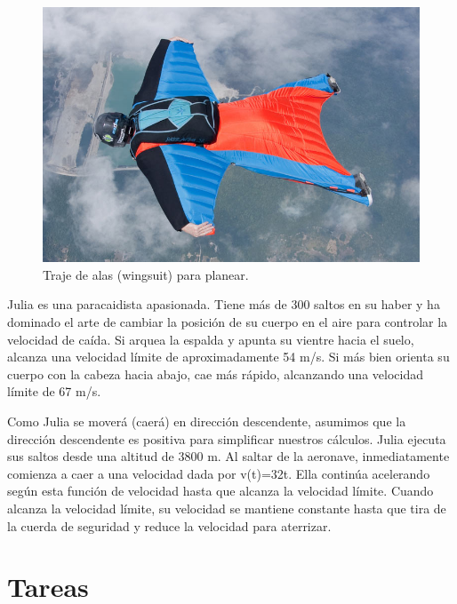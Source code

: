 \documentclass[
  a4paper,
]{scrreport}
\begin{document}
\begin{figure}

{\centering \includegraphics{img/caida-libre/wingsuit.jpg}

}

\caption{Traje de alas (wingsuit) para planear.}

\end{figure}

Julia es una paracaidista apasionada. Tiene más de 300 saltos en su
haber y ha dominado el arte de cambiar la posición de su cuerpo en el
aire para controlar la velocidad de caída. Si arquea la espalda y apunta
su vientre hacia el suelo, alcanza una velocidad límite de
aproximadamente 54 m/s. Si más bien orienta su cuerpo con la cabeza
hacia abajo, cae más rápido, alcanzando una velocidad límite de 67 m/s.

Como Julia se moverá (caerá) en dirección descendente, asumimos que la
dirección descendente es positiva para simplificar nuestros cálculos.
Julia ejecuta sus saltos desde una altitud de 3800 m. Al saltar de la
aeronave, inmediatamente comienza a caer a una velocidad dada por
v(t)=32t. Ella continúa acelerando según esta función de velocidad hasta
que alcanza la velocidad límite. Cuando alcanza la velocidad límite, su
velocidad se mantiene constante hasta que tira de la cuerda de seguridad
y reduce la velocidad para aterrizar.

\hypertarget{tareas-3}{%
\section{Tareas}\label{tareas-3}}
\end{document}
